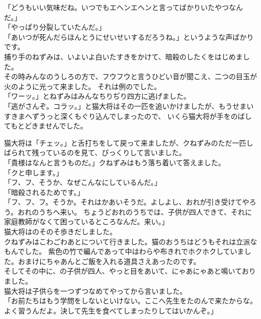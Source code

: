 \documentclass[
    a4paper,
    10pt,
    book]
    {tarticle}
\begin{document}
\newpage
\thispagestyle{fancy}
\fancyhead[R]{\empty}
「どうもいい気味だね。いつでもエヘンエヘンと言ってばかりいたやつなんだ。」\\
「やっぱり分裂していたんだ。」\\
「あいつが死んだらほんとうにせいせいするだろうね。」というような声ばかりです。\\
\indent 捕り手のねずみは、いよいよ白いたすきをかけて、暗殺のしたくをはじめました。\\
\indent その時みんなのうしろの方で、フウフウと言うひどい音が聞こえ、二つの目玉が火のように光って来ました。
それは例のでした。\\
「ワーッ。」とねずみはみんなちりぢり四方に逃げました。\\
「逃がさんぞ。コラッ。」と猫大将はその一匹を追いかけましたが、もうせまいすきまへずうっと深くもぐり込んでしまったので、
いくら猫大将が手をのばしてもとどきませんでした。

\newpage
\thispagestyle{fancy}
\fancyhead[C]{\empty}
\indent 猫大将は「チェッ。」と舌打ちをして戻って来ましたが、クねずみのただ一匹しばられて残っているのを見て、びっくりして言いました。\\
「貴様はなんと言うものだ。」クねずみはもう落ち着いて答えました。\\
「クと申します。」\\
「フ、フ、そうか、なぜこんなにしているんだ。」\\
「暗殺されるためです。」\\
「フ、フ、フ。そうか。それはかあいそうだ。よしよし、おれが引き受けてやろう。おれのうちへ来い。
ちょうどおれのうちでは、子供が四人できて、それに家庭教師がなくて困っているところなんだ。来い。」\\
\indent 猫大将はのそのそ歩きだしました。\\
\indent クねずみはこわごわあとについて行きました。猫のおうちはどうもそれは立派なもんでした。
紫色の竹で編んであって中はわらや布きれでホクホクしていました。おまけにちゃあんとご飯を入れる道具さえあったのです。\\
\indent そしてその中に、の子供が四人、やっと目をあいて、にゃあにゃあと鳴いておりました。\\
\indent 猫大将は子供らを一つずつなめてやってから言いました。\\
「お前たちはもう学問をしないといけない。ここへ先生をたのんで来たからな。よく習うんだよ。決して先生を食べてしまったりしてはいかんぞ。」
\end{document}

